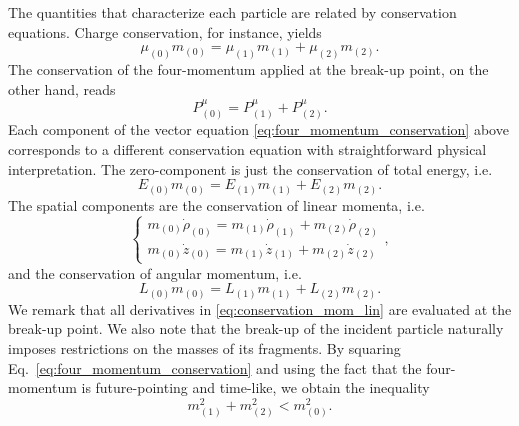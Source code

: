 The quantities that characterize each particle are related by conservation equations. Charge conservation, for instance, yields
\begin{equation}
  \mu_{(0)} m_{(0)}  = \mu_{(1)} m_{(1)} + \mu_{(2)} m_{(2)}.
  \label{eq:charge_conservation}
\end{equation}
The conservation of the four-momentum applied at the break-up point, on the other hand, reads
\begin{equation}
  P^{\mu}_{(0)} = P^{\mu}_{(1)} + P^{\mu}_{(2)}.
  \label{eq:four_momentum_conservation}
\end{equation}
Each component of the vector equation \eqref{eq:four_momentum_conservation} above corresponds to a different conservation equation with straightforward physical interpretation. The zero-component is just the conservation of total energy, i.e.
\begin{equation}
  E_{(0)}m_{(0)} = E_{(1)}m_{(1)} + E_{(2)}m_{(2)}.
  \label{eq:conservation_of_energy}
\end{equation}
The spatial components are the conservation of linear momenta, i.e.
\begin{equation}
  \begin{cases}
    m_{(0)}\dot{\rho}_{(0)} = m_{(1)}\dot{\rho}_{(1)} +m_{(2)}\dot{\rho}_{(2)} \\
    m_{(0)}\dot{z}_{(0)} = m_{(1)}\dot{z}_{(1)} + m_{(2)}\dot{z}_{(2)}
  \end{cases},
  \label{eq:conservation_mom_lin}
\end{equation}
and the conservation of angular momentum, i.e.
\begin{equation}
  L_{(0)}m_{(0)} = L_{(1)} m_{(1)} + L_{(2)}m_{(2)}.
  \label{eq:conservation_mom_ang}
\end{equation}
We remark that all derivatives in \eqref{eq:conservation_mom_lin} are evaluated at the break-up point. We also note that the break-up of the incident particle naturally imposes restrictions on the masses of its fragments. By squaring Eq.~\eqref{eq:four_momentum_conservation} and using the fact that the four-momentum is future-pointing and time-like, we obtain the inequality~\cite{bhat1985energetics}
\begin{equation} \label{eq:mass_constraint}
  m_{(1)}^2 + m_{(2)}^2 < m_{(0)}^2.
\end{equation}

